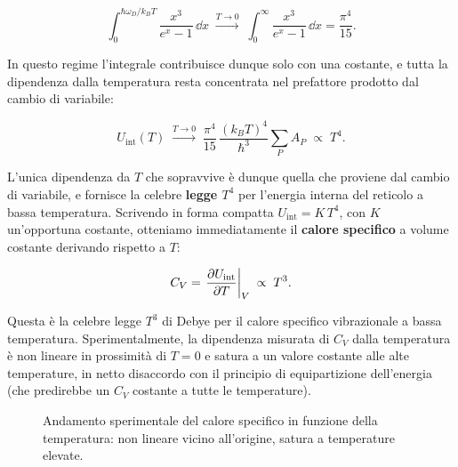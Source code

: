 \begin{equation}
    \int_{0}^{\hbar \omega_D / k_B T} \frac{x^{3}}{e^{x} - 1} \, \dd x \;\xrightarrow{T \to 0}\; \int_{0}^{\infty} \frac{x^{3}}{e^{x} - 1} \, \dd x = \frac{\pi^{4}}{15}.
\end{equation}

In questo regime l'integrale contribuisce dunque solo con una costante, e tutta la dipendenza dalla temperatura resta concentrata nel prefattore prodotto dal cambio di variabile:

\begin{importantbox}
    \begin{equation}
        U_{\text{int}}(T) \;\xrightarrow{T \to 0}\; \frac{\pi^{4}}{15} \, \frac{(k_B T)^{4}}{\hbar^{3}} \sum_{P} A_P \;\propto\; T^{4}.
    \end{equation}
\end{importantbox}

L'unica dipendenza da \( T \) che sopravvive è dunque quella che proviene dal cambio di variabile, e fornisce la celebre \textbf{legge \( T^{4} \)} per l'energia interna del reticolo a bassa temperatura. Scrivendo in forma compatta \( U_{\text{int}} = K \, T^{4} \), con \( K \) un'opportuna costante, otteniamo immediatamente il \textbf{calore specifico} a volume costante derivando rispetto a \( T \):

\begin{importantbox}
    \begin{equation}
        C_V = \left. \pdv{U_{\text{int}}}{T} \right|_V \;\propto\; T^{3}.
    \end{equation}
\end{importantbox}

Questa è la celebre legge \( T^{3} \) di Debye per il calore specifico vibrazionale a bassa temperatura. Sperimentalmente, la dipendenza misurata di \( C_V \) dalla temperatura è non lineare in prossimità di \( T = 0 \) e satura a un valore costante alle alte temperature, in netto disaccordo con il principio di equipartizione dell'energia (che predirebbe un \( C_V \) costante a tutte le temperature).

\begin{figure}[htbp]
    \centering
    \caption{Andamento sperimentale del calore specifico in funzione della temperatura: non lineare vicino all'origine, satura a temperature elevate.}
    \label{fig:cv_sperimentale}
\end{figure}

